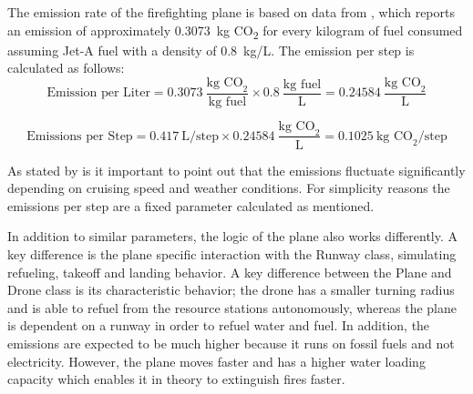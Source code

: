 \documentclass[twoside]{article}
\begin{document}
The emission rate of the firefighting plane is based on data from \citet*{spicerRapidMeasurementEmissions2009}, which reports an emission of approximately \SI{0.3073}{\kilo\gram} CO\textsubscript{2} for every kilogram of fuel consumed assuming Jet-A fuel with a density of 0.8~kg/L. The emission per step is calculated as follows: 
\[
\text{Emission per Liter}  = 0.3073~\frac{\text{kg CO}_2}{\text{kg fuel}} \times 0.8~\frac{\text{kg fuel}}{\text{L}} = 0.24584~\frac{\text{kg CO}_2}{\text{L}}
\]

\[
\text{Emissions per Step} = 0.417~\text{L/step} \times 0.24584~\frac{\text{kg CO}_2}{\text{L}} = 0.1025~\text{kg CO}_2/\text{step}
\]


As stated by \citet*{spicerRapidMeasurementEmissions2009} is it important to point out that the emissions fluctuate significantly depending on cruising speed and weather conditions. For simplicity reasons the emissions per step are a fixed parameter calculated as mentioned.

In addition to similar parameters, the logic of the plane also works differently. A key difference is the plane specific interaction with the Runway class, simulating refueling, takeoff and landing behavior. A key difference between the Plane and Drone class is its characteristic behavior; the drone has a smaller turning radius and is able to refuel from the resource stations autonomously, whereas the plane is dependent on a runway in order to refuel water and fuel. In addition, the emissions are expected to be much higher because it runs on fossil fuels and not electricity. However, the plane moves faster and has a higher water loading capacity which enables it in theory to extinguish fires faster. 
\end{document}
